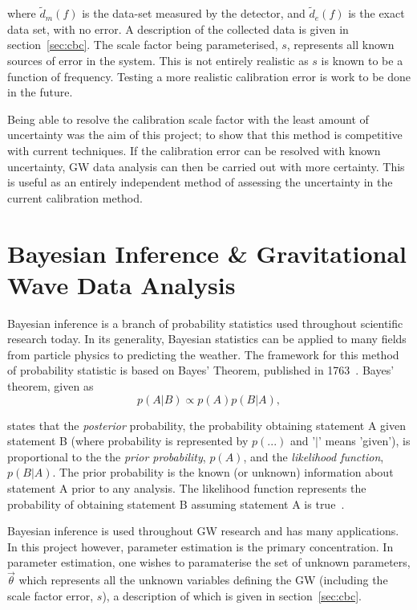 \documentclass{jpconf}
\begin{document}
where $\tilde{d}_m(f)$ is the data-set measured by the detector, and $\tilde{d}_e(f)$ is the exact data set, with no error. A description of the collected data is given in section~\ref{sec:cbc}. The scale factor being parameterised, $s$, represents all known sources of error in the system. This is not entirely realistic as $s$ is known to be a function of frequency. Testing a more realistic calibration error is work to be done in the future. 


Being able to resolve the calibration scale factor with the least amount of uncertainty was the aim of this project; to show that this method is competitive with current techniques. If the calibration error can be resolved with known uncertainty, GW data analysis can then be carried out with more certainty. This is useful as an entirely independent method of assessing the uncertainty in the current calibration method.

\section{Bayesian Inference \& Gravitational Wave Data Analysis}
\label{sec:bpe}


Bayesian inference is a branch of probability statistics used throughout scientific research today. In its generality, Bayesian statistics can be applied to many fields from particle physics to predicting the weather. The framework for this method of probability statistic is based on Bayes' Theorem, published in 1763~\cite{Bayes}. Bayes' theorem, given as 
\begin{equation}
  \label{eq:bayesthm}
  p(A|B) \propto p(A) p(B|A),
\end{equation}

states that the \textit{posterior} probability, the probability obtaining statement A given statement B (where probability is represented by $p(...)$ and '$|$' means 'given'), is proportional to the the \textit{prior probability}, $p(A)$, and the \textit{likelihood function}, $p(B|A)$. The prior probability is the known (or unknown) information about statement A prior to any analysis. The likelihood function represents the probability of obtaining statement B assuming statement A is true~\cite{Sivia}. 


Bayesian inference is used throughout GW research and has many applications. In this project however, parameter estimation is the primary concentration. In parameter estimation, one wishes to paramaterise the set of unknown parameters, $\vec{\theta}$ which represents all the unknown variables defining the GW (including the scale factor error, $s$), a description of which is given in section~\ref{sec:cbc}. 
\end{document}
